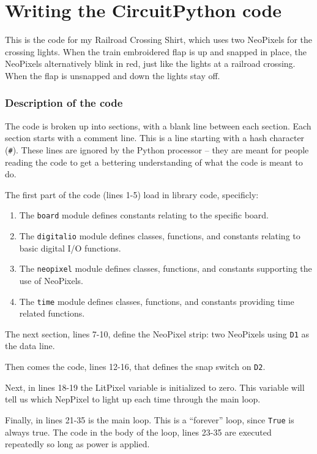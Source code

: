 \documentclass[letterpaper,twoside,12pt]{article}
\begin{document}
\part{Writing the CircuitPython code}

This is the code for my Railroad Crossing Shirt, which uses two NeoPixels for 
the crossing lights.  When the train embroidered flap is up and snapped in 
place, the NeoPixels alternatively blink in red, just like the lights at a 
railroad crossing.  When the flap is unsnapped and down the lights stay off.
\section{Description of the code}

The code is broken up into sections, with a blank line between each section.
Each section starts with a comment line. This is a line starting with a hash
character (\texttt{\#}). These lines are ignored by the Python processor -- they
are meant for people reading the code to get a bettering understanding of what
the code is meant to do.

The first part of the code (lines 1-5) load in library code, specificly:
\begin{enumerate}
\item The \texttt{board} module defines constants relating to the specific 
board.
\item The \texttt{digitalio} module defines classes, functions, and constants 
relating to basic digital I/O functions.
\item The \texttt{neopixel} module defines classes, functions, and constants 
supporting the use of NeoPixels.
\item The \texttt{time} module defines classes, functions, and constants 
providing time related functions.
\end{enumerate}

The next section, lines 7-10, define the NeoPixel strip: two NeoPixels using 
\texttt{D1} as the data line.

Then comes the code, lines 12-16, that defines the snap switch on \texttt{D2}.

Next, in lines 18-19 the LitPixel variable is initialized to zero. This
variable will tell us which NepPixel to light up each time through the main
loop.

Finally, in lines 21-35 is the main loop. This is a ``forever'' loop, since
\texttt{True} is always true. The code in the body of the loop, lines 23-35
are executed repeatedly so long as power is applied.
\end{document}
